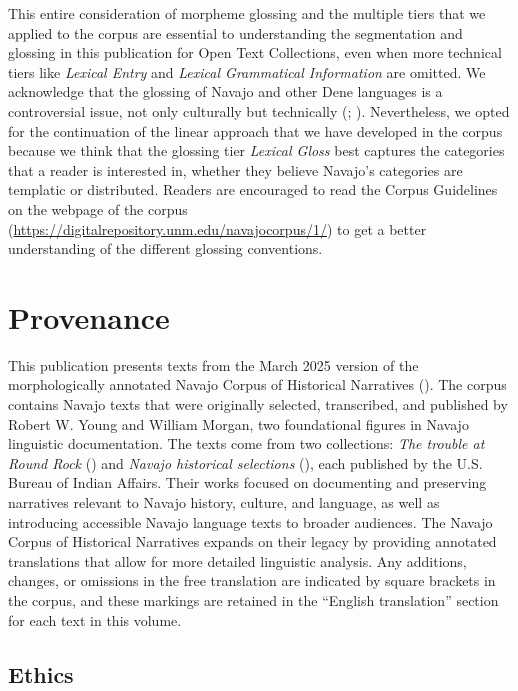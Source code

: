 This entire consideration of morpheme glossing and the multiple tiers that we applied to the corpus are essential to understanding the segmentation and glossing in this publication for Open Text Collections, even when more technical tiers like \textit{Lexical Entry} and \textit{Lexical Grammatical Information} are omitted. We acknowledge that the glossing of Navajo and other Dene languages is a controversial issue, not only culturally but technically (\cite{Hargus:2020wv}; \cite{Denk:2024aq}). Nevertheless, we opted for the continuation of the linear approach that we have developed in the corpus because we think that the glossing tier \textit{Lexical Gloss} best captures the categories that a reader is interested in, whether they believe Navajo's categories are templatic or distributed. Readers are encouraged to read the Corpus Guidelines on the webpage of the corpus (\url{https://digitalrepository.unm.edu/navajocorpus/1/}) to get a better understanding of the different glossing conventions.

\section{Provenance}

This publication presents texts from the March 2025 version of the morphologically annotated Navajo Corpus of Historical Narratives (\cite{Denk:2025zp}). The corpus contains Navajo texts that were originally selected, transcribed, and published by Robert W. Young and William Morgan, two foundational figures in Navajo linguistic documentation. The texts come from two collections: \textit{The trouble at Round Rock} (\citeyear{Young:1952cy}) and \textit{Navajo historical selections} (\citeyear{Young:1954jz}), each published by the U.S. Bureau of Indian Affairs. Their works focused on documenting and preserving narratives relevant to Navajo history, culture, and language, as well as introducing accessible Navajo language texts to broader audiences. The Navajo Corpus of Historical Narratives expands on their legacy by providing annotated translations that allow for more detailed linguistic analysis. 
Any additions, changes, or omissions in the free translation are indicated by square brackets in the corpus, and these markings are retained in the ``English translation'' section for each text in this volume.

\subsection{Ethics}

